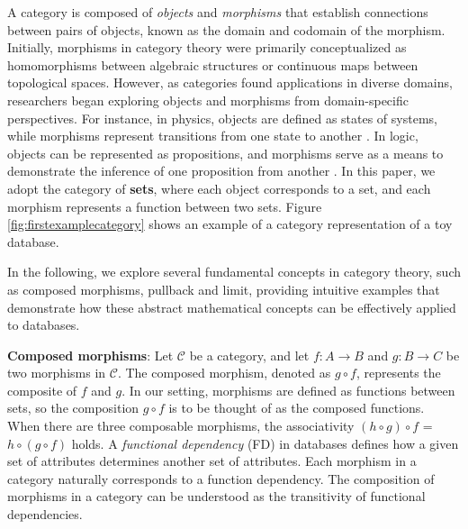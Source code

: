 A category is composed of \textit{objects} and \textit{morphisms} that establish connections between pairs of objects, known as the domain and codomain of the morphism. Initially, morphisms in category theory were primarily conceptualized as homomorphisms between algebraic structures or continuous maps between topological spaces. However, as categories found applications in diverse domains, researchers began exploring objects and morphisms from domain-specific perspectives. For instance, in physics, objects are defined as states of systems, while morphisms represent transitions from one state to another \cite{coecke2006introducing}. In logic, objects can be represented as propositions, and morphisms serve as a means to demonstrate the inference of one proposition from another \cite{blute2004category}. In this paper, we adopt the category of \textbf{sets}, where each object corresponds to a set, and each morphism represents a function between two sets. Figure \ref{fig:firstexamplecategory} shows an example of a category representation of a toy database. 



In the following, we explore several fundamental concepts in category theory, such as composed morphisms, pullback and limit, providing intuitive examples that demonstrate how these abstract mathematical concepts can be effectively applied to databases.



\noindent \textbf{Composed morphisms}: Let $\mathcal{C}$ be a category, and let $f: A \to B$ and $g: B \to C$ be two morphisms in $\mathcal{C}$. The composed morphism, denoted as $g \circ f$, represents the composite of $f$ and $g$. In our setting, morphisms are defined as functions between sets, so the composition $g \circ f$ is to be thought of as the composed functions.  When there are three composable morphisms, the associativity  $(h \circ g) \circ f$ = $h \circ (g \circ f)$ holds. A \textit{functional dependency} (FD) in databases defines how a given set of attributes determines another set of attributes.  Each morphism in a category naturally corresponds to a function dependency. The composition of morphisms in a category can be understood as the transitivity of functional dependencies. 
 
